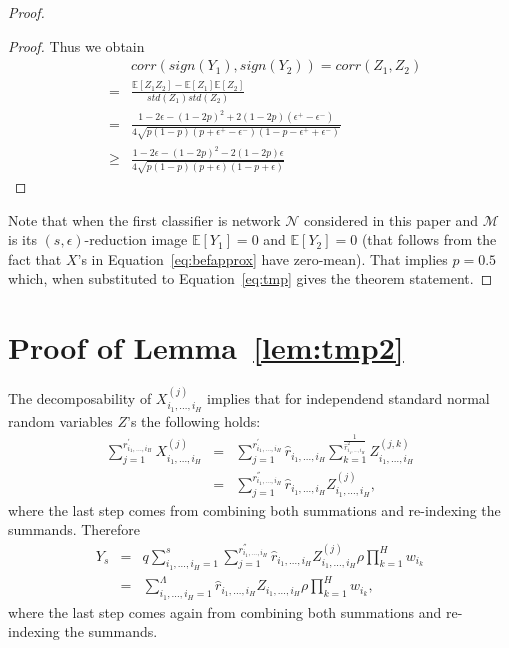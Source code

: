 \documentclass[twoside]{article}
\begin{document}
\begin{proof}
\begin{proof}
Thus we obtain
\begin{eqnarray}
&&\!\!\!\!\!\!\!\!\!\!\!\!\!\!\!corr(sign(Y_1),sign(Y_2)) = corr(Z_1,Z_2) \nonumber\\
&\!\!\!\!\!\!\!\!\!\!\!\!\!\!\!=& \!\!\!\!\!\!\!\!\!\!\frac{\mathbb{E}[Z_1Z_2] - \mathbb{E}[Z_1]\mathbb{E}[Z_2]}{std(Z_1)std(Z_2)} \nonumber\\
&\!\!\!\!\!\!\!\!\!\!\!\!\!\!\!=& \!\!\!\!\!\!\!\!\!\!\frac{1 - 2\epsilon - (1 - 2p)^2 + 2(1 - 2p)(\epsilon^{+} - \epsilon^{-})}{4\sqrt{p(1 - p)(p + \epsilon^{+} - \epsilon^{-})(1 - p - \epsilon^{+} + \epsilon^{-})}} \nonumber\\
&\!\!\!\!\!\!\!\!\!\!\!\!\!\!\!\geq& \!\!\!\!\!\!\!\!\!\!\frac{1 - 2\epsilon - (1 - 2p)^2 - 2(1 - 2p)\epsilon}{4\sqrt{p(1 - p)(p + \epsilon)(1 - p + \epsilon)}}
\label{eq:tmp}
\end{eqnarray}
\end{proof}
Note that when the first classifier is network $\mathcal{N}$ considered in this paper and $\mathcal{M}$ is its $(s,\epsilon)$-reduction image $\mathbb{E}[Y_1] = 0$ and $\mathbb{E}[Y_2] = 0$ (that follows from the fact that $X$'s in Equation~\ref{eq:befapprox} have zero-mean). That implies $p=0.5$ which, when substituted to Equation~\ref{eq:tmp} gives the theorem statement.
\end{proof}

\section{Proof of Lemma~\ref{lem:tmp2}}

The decomposability of $X_{i_1,\dots,i_H}^{(j)}$ implies that for independend standard normal random variables $Z$'s the following holds:
\begin{eqnarray*}
\sum_{j=1}^{r_{i_1,\dots,i_H}^{'}}X_{i_1,\dots,i_H}^{(j)} &\!\!\!\!\!=& \!\!\!\!\!\sum_{j=1}^{r_{i_1,\dots,i_H}^{'}}\hat{r}_{i_1,\dots,i_H}\sum_{k=1}^{\frac{1}{\hat{r}_{i_1,\dots,i_H}^2}}Z_{i_1,\dots,i_H}^{(j,k)}\\
&\!\!\!\!\!=& \!\!\!\!\!\sum_{j=1}^{r_{i_1,\dots,i_H}^{''}}\hat{r}_{i_1,\dots,i_H}Z_{i_1,\dots,i_H}^{(j)},
\end{eqnarray*}
where the last step comes from combining both summations and re-indexing the summands. Therefore
\begin{eqnarray*}
Y_s &=& q\sum_{i_1,\dots,i_H=1}^{s}\sum_{j=1}^{r_{i_1,\dots,i_H}^{''}}\hat{r}_{i_1,\dots,i_H}Z_{i_1,\dots,i_H}^{(j)}\rho\prod_{k = 1}^{H}w_{i_k}\\
&=& \sum_{i_1,\dots,i_H=1}^{\Lambda}\hat{r}_{i_1,\dots,i_H}Z_{i_1,\dots,i_H}\rho\prod_{k = 1}^{H}w_{i_k},
\end{eqnarray*}
where the last step comes again from combining both summations and re-indexing the summands. 
\end{document}

